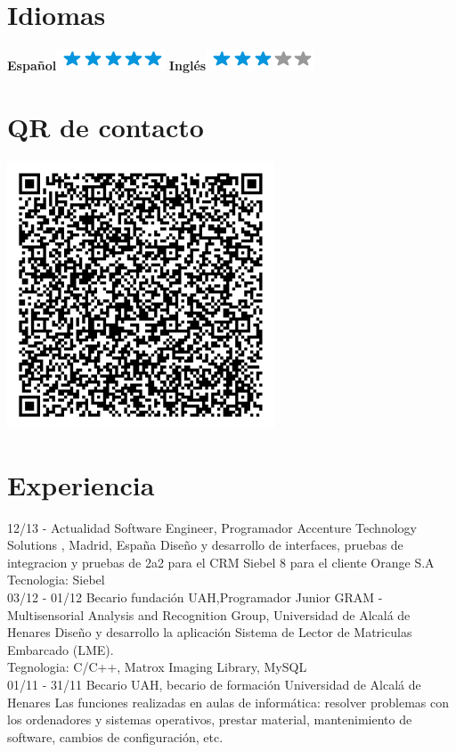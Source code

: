 \documentclass[]{friggeri-cv}
\begin{document}
\begin{aside}
  \section{Idiomas}
    \textbf{Español}\includegraphics[scale=0.40]{img/5stars.png}
    \textbf{Inglés}\includegraphics[scale=0.40]{img/3stars.png}
    ~
  \section{QR de contacto}
    \includegraphics[scale=0.35]{img/QR.png}
    ~
\end{aside}

\section{Experiencia}
\begin{entrylist}
  \entry
    {12/13 - Actualidad}
    {Software Engineer, Programador}
    {Accenture Technology Solutions , Madrid, España}
    {Diseño y desarrollo de interfaces, pruebas de integracion y pruebas de 2a2 para el CRM Siebel 8 para el cliente Orange S.A \\}
    {Tecnologia: Siebel\\}
  \entry
    {03/12 - 01/12}
    {Becario fundación UAH,Programador Junior}
    {GRAM - Multisensorial Analysis and Recognition Group, Universidad de Alcalá de Henares}
    {Diseño y desarrollo la aplicación Sistema de Lector de Matriculas Embarcado (LME).\\}
    {Tegnologia: C/C++, Matrox Imaging Library, MySQL\\}
    \entry
    {01/11 - 31/11}
    {Becario UAH, becario de formación}
    {Universidad de Alcalá de Henares}
    {Las funciones realizadas en aulas de informática: resolver problemas con los ordenadores y sistemas operativos, prestar material, mantenimiento de software, cambios de configuración, etc. }
    {}

\end{entrylist}
\end{document}
